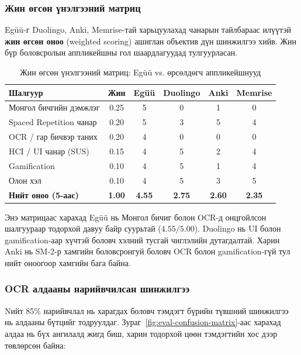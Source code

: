 \subsubsection{Жин өгсөн үнэлгээний матриц}

Egüü-г Duolingo, Anki, Memrise-тай харьцуулахад чанарын тайлбараас илүүтэй \textbf{жин өгсөн оноо} (weighted scoring) ашиглан объектив дүн шинжилгээ хийв. Жин бүр боловсролын аппликейшны гол шаардлагуудад тулгуурласан.

\begin{table}[H]
\centering
\caption{Жин өгсөн үнэлгээний матриц: Egüü vs. өрсөлдөгч аппликейшнууд}
\label{tab:weighted-scoring}
\footnotesize
\begin{tabular}{|l|c|c|c|c|c|}
\hline
\textbf{Шалгуур} & \textbf{Жин} & \textbf{Egüü} & \textbf{Duolingo} & \textbf{Anki} & \textbf{Memrise} \\
\hline
Монгол бичгийн дэмжлэг & 0.25 & 5 & 0 & 1 & 0 \\
Spaced Repetition чанар & 0.20 & 5 & 3 & 5 & 4 \\
OCR / гар бичвэр таних & 0.20 & 4 & 0 & 0 & 0 \\
HCI / UI чанар (SUS) & 0.15 & 4 & 5 & 2 & 4 \\
Gamification & 0.10 & 4 & 5 & 1 & 4 \\
Олон хэл & 0.10 & 4 & 5 & 3 & 5 \\
\hline
\textbf{Нийт оноо (5-аас)} & \textbf{1.00} & \textbf{4.55} & \textbf{2.75} & \textbf{2.60} & \textbf{2.35} \\
\hline
\end{tabular}
\normalsize
\end{table}

Энэ матрицаас харахад Egüü нь Монгол бичиг болон OCR-д онцгойлсон шалгуураар тодорхой давуу байр суурьтай ($4.55 / 5.00$). Duolingo нь UI болон gamification-аар хүчтэй боловч хэлний тусгай чиглэлийн дутагдалтай. Харин Anki нь SM-2-р хамгийн боловсронгуй боловч OCR болон gamification-гүй тул нийт оноогоор хамгийн бага байна.

\subsubsection{OCR алдааны нарийвчилсан шинжилгээ}

Nийт 85\% нарийвчлал нь харагдах боловч тэмдэгт бүрийн түвшний шинжилгээ нь алдааны бүтцийг тодруулдаг. Зураг~\ref{fig:eval-confusion-matrix}-аас харахад алдаа нь бүх ангилалд жигд биш, харин тодорхой цөөн тэмдэгтийн хос дээр төвлөрсөн байна:


